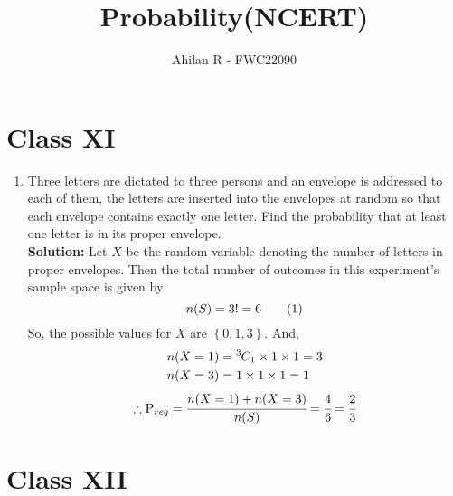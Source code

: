 \documentclass[journal,12pt,twocolumn]{IEEEtran}
\providecommand{\cbrak}[1]{\ensuremath{\left\{#1\right\}}}
\newcommand{\solution}{\noindent \textbf{Solution: }}
\newcommand*{\permcomb}[4][0mu]{{{}^{#3}\mkern#1#2_{#4}}}
\newcommand*{\comb}[1][-1mu]{\permcomb[#1]{C}}
\newcommand\numberthis{\addtocounter{equation}{1}\tag{\theequation}}
\begin{document}
\title{Probability(NCERT)}
\author{Ahilan R - FWC22090
	}

\maketitle

\section*{Class XI}

\begin{enumerate}[label=16.\arabic{enumi}.\arabic{enumii}]%
\setcounter{enumi}{3}
\setcounter{enumii}{6}
\item Three letters are dictated to three persons and an envelope is addressed to each of them, the letters are inserted into the envelopes at random so that each envelope contains exactly one letter. Find the probability that at least one letter is in its proper envelope.\\
	\solution 
		Let $X$ be the random variable denoting the number of letters in proper envelopes. Then the total number of outcomes in this experiment's sample space is given by \[n(S)=3!=6 \numberthis \] So, the possible values for $X$ are \cbrak{0,1,3}. And,
  \begin{align}
	  n(X=1) &= \comb{3}{1} \times 1 \times 1 = 3 \\
	  n(X=3) &= 1 \times 1 \times 1 = 1
  \end{align}
  \begin{align}
	  \therefore \text{P}_{req} = \cfrac{n(X=1)+n(X=3)}{n(S)} = \cfrac{4}{6} = \cfrac{2}{3} 
  \end{align}
\end{enumerate}

\section*{Class XII}
\end{document}
